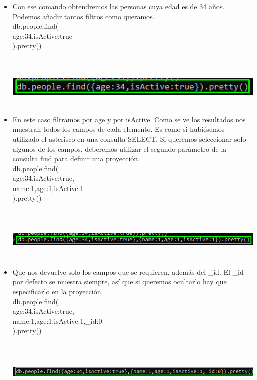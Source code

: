 \documentclass[12pt,a4paper,oneside]{book}
\begin{document}
	\newpage
\begin{itemize}
	\item {Con ese comando obtendremos las personas cuya edad es de 34 años. Podemos añadir tantos filtros como queramos.\\
		 db.people.find(\\
		{age:34,isActive:true}\\
		).pretty()
		
		
	}\\	
	\includegraphics[width=16cm, height=2cm]{img/14.png}\\
	
	
	
	\item {En este caso filtramos por age y por isActive. Como se ve los resultados nos muestran todos los campos de cada elemento. Es como si hubiésemos utilizado el asterisco en una consulta SELECT. Si queremos seleccionar solo algunos de los campos, deberemos utilizar el segundo parámetro de la consulta find para definir una proyección. \\
		db.people.find(\\
		{age:34,isActive:true},\\
		{name:1,age:1,isActive:1}\\
		).pretty()	
		
	}\\	
	\includegraphics[width=16cm, height=2cm]{img/15.png}\\
	
	
	\item {Que nos devuelve solo los campos que se requieren, además del \_id. El \_id por defecto se muestra siempre, así que si queremos ocultarlo hay que especificarlo en la proyección.\\
		
		db.people.find(\\
		{age:34,isActive:true},\\
		{name:1,age:1,isActive:1,\_id:0}\\
		).pretty()
			
		
	}\\	
	\includegraphics[width=16cm, height=2cm]{img/16.png}\\
	
	
\end{itemize}
\end{document}
